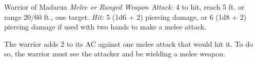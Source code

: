 \documentclass[10pt,a4paper,twoside,bg=print,twocolumn,openany,nodeprecatedcode]{dndbook}
\begin{document}
\begin{DndMonster}[float=t]{Warrior of Madarua}
\DndMonsterBasics[
armor-class = {12 (\textit{leather armor})},
hit-points = {\DndDice{2d8 + 2}},
speed = {30 ft.}
]
\DndMonsterAbilityScores[
 str = 15,
 dex = 12,
 con = 13,
 int = 10,
 wis = 10,
 cha = 10
]
\DndMonsterDetails[
skills = {Acrobatics +3, Religion +2},
languages = {Common},
challenge = 1/8,
]
\textsl{Melee or Ranged Weapon Attack:} 4 to hit, reach 5 ft. or range 20/60 ft., one target. \textsl{Hit:} 5 (1d6 + 2) piercing damage, or 6 (1d8 + 2) piercing damage if used with two hands to make a melee attack.

The warrior adds 2 to its AC against one melee attack that would hit it. To do so, the warrior must see the attacker and be wielding a melee weapon.

\end{DndMonster}
\end{document}
